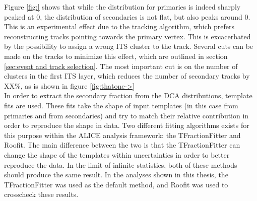Figure \ref{fig:} shows that while the distribution for primaries is indeed sharply peaked at 0, the distribution of secondaries is not flat, but also peaks around 0. This is an experimental effect due to the tracking algorithm, which prefers reconstructing tracks pointing towards the primary vertex. This is excacerbated by the possibility to assign a wrong ITS cluster to the track. Several cuts can be made on the tracks to minimize this effect, which are outlined in section \ref{sec:event and track selection}. The most important cut is on the number of clusters in the first ITS layer, which reduces the number of secondary tracks by XX\%, as is shown in figure \ref{fig:thatone->} %
\\
In order to extract the secondary fraction from the DCA distributions, template fits are used. These fits take the shape of input templates (in this case from primaries and from secondaries) and try to match their relative contribution in order to reproduce the shape in data. Two different fitting algorithms exists for this purpose within the ALICE analysis framework: the TFractionFitter and Roofit. The main difference between the two is that the TFractionFitter can change the shape of the templates within uncertainties in order to better reproduce the data. In the limit of infinite statistics, both of these methods should produce the same result. In the analyses shown in this thesis, the TFractionFitter was used as the default method, and Roofit was used to crosscheck these results. \\
